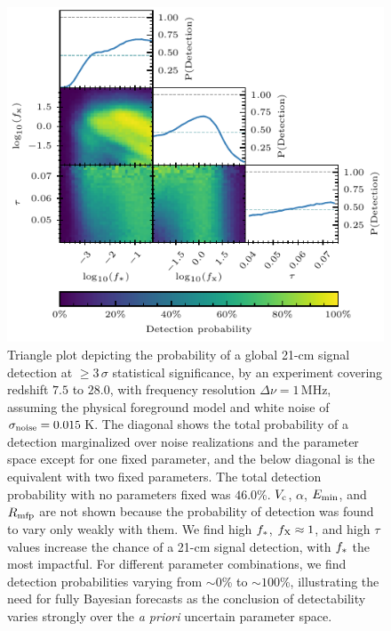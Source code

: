 \documentclass[twocolumn,english,aps,prd,amsmath,amssymb,reprint,floatfix,nofootinbib,showkeys]{revtex4-2}
\newif\ifhighlightchanges
\newcommand{\change}[1]{{\ifhighlightchanges\color{red} #1\else #1\fi}}
\begin{document}
\begin{figure}
\includegraphics{figures/detectability_triangle_3_sigma_noise_0.0150_K.pdf}
    \caption{Triangle plot depicting the probability of a global 21-cm signal detection at $\geq 3$\,$\sigma$ statistical significance, by an experiment covering redshift $7.5$ to $28.0$, with frequency resolution $\Delta \nu = 1$\,MHz, \change{assuming the \citet{Hills_2018} physical foreground model} and white noise of \change{\mbox{$\sigma_{\rm noise} = 0.015$\,K}}.
The diagonal shows the total probability of a detection marginalized over noise realizations and the parameter space except for one fixed parameter, and the below diagonal is the equivalent with two fixed parameters. 
The total detection probability with no parameters fixed was \change{$46.0$}\%.
$V_{\rm c}$, $\alpha$, $E_{\rm min}$, and $R_{\rm mfp}$ are not shown because the probability of detection was found to vary \change{only weakly} with them. 
We find high $f_{\rm *}$, \change{$f_{\rm X} \approx 1$}, and \change{high} $\tau$ values increase the chance of a 21-cm signal detection, with \change{$f_{\rm *}$} the most impactful.  
For different parameter combinations, we find detection probabilities varying from $\sim 0$\% to $\sim 100$\%, illustrating the need for fully Bayesian forecasts as the conclusion of detectability varies strongly over the \textit{a priori} uncertain parameter space. }
\label{fig:headline_plot}
\end{figure}
\end{document}
